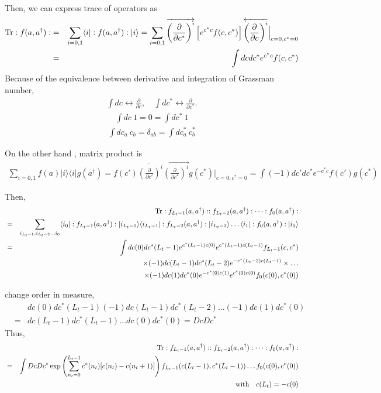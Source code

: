 \documentclass[10pt]{book}
\newcommand{\bea}{\begin{eqnarray}}
\newcommand{\eea}{\end{eqnarray}}
\newcommand{\no}{\nonumber \\}
\newcommand{\del}{\partial}
\def\la{\langle}
\def\ra{\rangle}
\begin{document}
Then, we can express trace of operators as
\bea 
{\rm Tr}:f(a,a^\dagger): &=& \sum_{i=0,1} \la i|:f(a,a^\dagger):|i\ra 
=\sum_{i=0,1} \overrightarrow{ \left(\frac{\del}{\del c^*}\right)^i}
\left[ e^{c^* c} f(c,c^*) \right] \overleftarrow{ \left(\frac{\del}{\del c}\right)^i}  
\Big|_{c=0,c^*=0} \no 
 &=& \int d c d c^* e^{c^* c} f(c,c^*)
\eea 
Because of the equivalence between derivative and integration of Grassman number,
\bea 
\int d c \leftrightarrow \frac{\del}{\del c}, \quad 
\int d c^* \leftrightarrow \frac{\del}{\del c^*}.
\eea 
\bea 
\int d c \ 1 = 0 = \int d c^* \ 1
\eea 
\bea 
\int d c_a\ c_{b} =\delta_{ab}=\int d c^*_a\ c^*_{b} 
\eea 


On the other hand , matrix product is 
\bea 
\sum_{i=0,1} f(a)|i\ra \la i|g(a^\dagger) = f(c')\overleftarrow{ \left(\frac{\del}{\del c'}\right)^i}
                        \overrightarrow{ \left(\frac{\del}{\del c^*}\right)^i} g(c^*) \Big|_{c=0,c^*=0}
                      =\int (-1) d c' dc^* e^{-c^* c} f(c') g(c^*)
\eea 

Then,
\bea 
& &{\rm Tr} :f_{L_t-1}(a,a^\dagger)::f_{L_t-2}(a,a^\dagger):\dots :f_{0}(a,a^\dagger):\no 
&=&\sum_{i_{L_t-1},i_{L_t-2}\dots i_{0}}
   \la i_0|:f_{L_t-1}(a,a^\dagger):|i_{L_t-1}\ra \la i_{L_t-1}| :f_{L_t-2}(a,a^\dagger):|i_{L_t-2}\ra \dots 
   \la i_1 |:f_{0}(a,a^\dagger):|i_0\ra \no 
&=&\int d c(0) d c^*(L_t-1) e^{c^*(L_t-1) c(0)} e^{ c^*(L_t-1) c(L_t-1)} f_{L_t-1}(c,c^*) \no 
   & &  \times (-1) d c(L_t-1) d c^*(L_t-2) e^{-c^*(L_t-2)c(L_t-1)}\times \dots \no 
   & &  \times (-1) d c(1) d c^*(0) e^{-c^*(0) c(1)} e^{c^*(0)c(0)} f_0(c(0),c^*(0))  
\eea 

change order in measure,
\bea 
& &dc(0) dc^*(L_t-1)(-1) d c(L_t-1) dc^*(L_t-2)\dots (-1) dc(1) dc^*(0) \no 
&=& dc(L_t-1) dc^*(L_t-1)\dots d c(0) dc^*(0)
  = Dc Dc^*
\eea 
Thus,
\bea 
& &{\rm Tr}:f_{L_t-1}(a,a^\dagger)::f_{L_t-2}(a,a^\dagger):\dots :f_{0}(a,a^\dagger): \no 
&=&\int Dc Dc^* \exp \left( \sum_{n_t=0}^{L_t-1} c^*(n_t)[c(n_t)-c(n_{t}+1)] \right) 
           f_{L_t-1}(c(L_t-1),c^*(L_t-1))\dots f_0(c(0),c^*(0))\no 
& & \quad\mbox{with}\quad  c(L_t)=-c(0)            
\eea 
\end{document}
